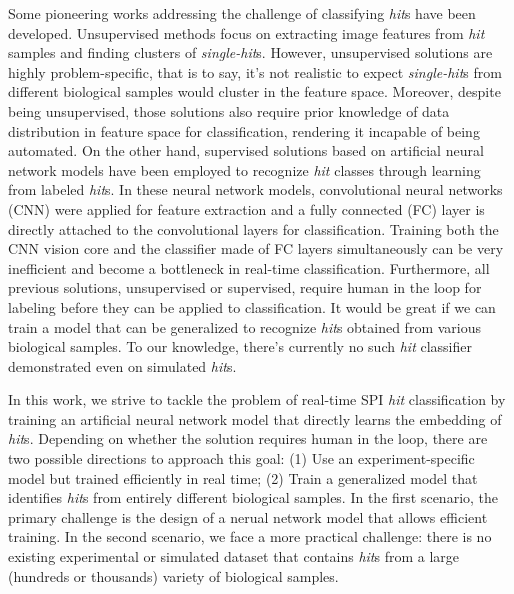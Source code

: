 
Some pioneering works addressing the challenge of classifying \textit{hit}s have
been developed.  Unsupervised methods
\cite{yoonUnsupervisedClassificationSingleparticle2011,
giannakisSymmetriesImageFormation2012,schwanderSymmetriesImageFormation2012,
yoonNovelAlgorithmsCoherent2012,
andreassonAutomatedIdentificationClassification2014,
bobkovSortingAlgorithmsSingleparticle2015} focus on extracting image features
from \textit{hit} samples and finding clusters of \textit{single-hit}s.  However,
unsupervised solutions are highly problem-specific, that is to say, it's not
realistic to expect \textit{single-hit}s from different biological samples would
cluster in the feature space.  Moreover, despite being unsupervised, those
solutions also require prior knowledge of data distribution in feature space for
classification, rendering it incapable of being automated.  On the other hand,
supervised solutions based on artificial neural network models
\cite{shiEvaluationPerformanceClassification2019,
ignatenkoClassificationDiffractionPatterns2021} have been employed to recognize
\textit{hit} classes through learning from labeled \textit{hit}s.  In these
neural network models, convolutional neural networks (CNN) were applied for
feature extraction and a fully connected (FC) layer is directly attached to the
convolutional layers for classification.  Training both the CNN vision core and
the classifier made of FC layers simultaneously can be very inefficient and
become a bottleneck in real-time classification.  Furthermore, all previous
solutions, unsupervised or supervised, require human in the loop for labeling
before they can be applied to classification.  It would be great if we can train
a model that can be generalized to recognize \textit{hit}s obtained from various
biological samples.  To our knowledge, there's currently no such \textit{hit}
classifier demonstrated even on simulated \textit{hit}s.  



In this work, we strive to tackle the problem of real-time SPI \textit{hit}
classification by training an artificial neural network model that directly
learns the embedding of \textit{hit}s.  Depending on whether the solution
requires human in the loop, there are two possible directions to approach this
goal: (1) Use an experiment-specific model but trained efficiently in real time;
(2) Train a generalized model that identifies \textit{hit}s from entirely
different biological samples.  In the first scenario, the primary challenge is
the design of a nerual network model that allows efficient training.  In the
second scenario, we face a more practical challenge: there is no existing
experimental or simulated dataset that contains \textit{hit}s from a large
(hundreds or thousands) variety of biological samples.

